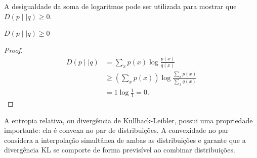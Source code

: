 A desigualdade da soma de logaritmos pode ser utilizada para mostrar que $D(p \mid\mid q) \geq 0$.
\begin{proposition}
$D(p \mid\mid q) \geq 0$
\end{proposition}
\begin{proof}
  \begin{subequations}
  \begin{align}
  D(p \mid\mid q) &= \sum_x p(x) \log \frac{p(x)}{q(x)} \\
          &\geq \left( \sum_x p(x) \right) \log \frac{\sum_x p(x)}{\sum_x q(x)} \\
          &= 1 \log \frac{1}{1} = 0 .
  \end{align}
  \end{subequations}
\end{proof}


A entropia relativa, ou divergência de Kullback-Leibler, possui uma propriedade importante: ela é convexa no par de distribuições.
A convexidade no par considera a interpolação simultânea de ambas as distribuições e garante que a divergência KL se comporte de forma previsível ao combinar distribuições.

